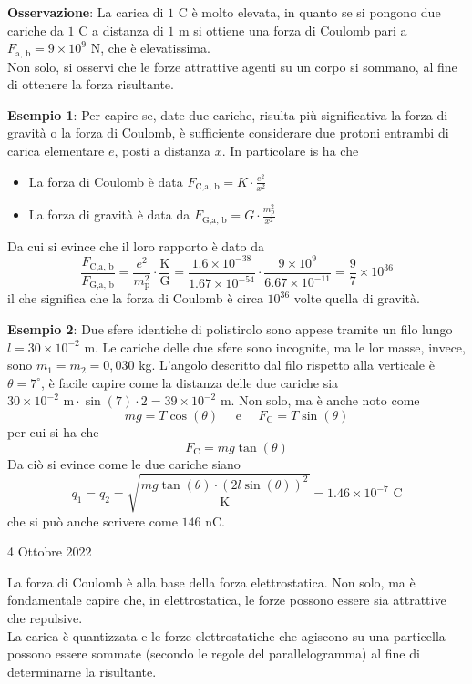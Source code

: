 \documentclass[a4paper]{extarticle}
\begin{document}
\vspace{1em}
\noindent
\textbf{Osservazione}: La carica di $1$ C è molto elevata, in quanto se si pongono due cariche da $1$ C a distanza di $1$ m si ottiene una forza di Coulomb pari a $F_{\text{a, b}} = 9 \times 10^9$ N, che è elevatissima.\\
Non solo, si osservi che le forze attrattive agenti su un corpo si sommano, al fine di ottenere la forza risultante.

\vspace{1em}
\noindent
\textbf{Esempio 1}: Per capire se, date due cariche, risulta più significativa la forza di gravità o la forza di Coulomb, è sufficiente considerare due protoni entrambi di carica elementare $e$, posti a distanza $x$.
In particolare is ha che
\begin{itemize}
  \item La forza di Coulomb è data $F_{\text{C}, \text{a, b}} = K \cdot \frac{e^2}{x^2}$
  \item La forza di gravità è data da $F_{\text{G}, \text{a, b}} = G \cdot \frac{m_\text{p}^2}{x^2}$
\end{itemize}
Da cui si evince che il loro rapporto è dato da
\[\frac{F_{\text{C}, \text{a, b}}}{F_{\text{G}, \text{a, b}}} = \frac{e^2}{m_\text{p}^2} \cdot \frac{\text{K}}{\text{G}} = \frac{1.6 \times 10^{-38}}{1.67 \times 10^{-54}} \cdot \frac{9 \times 10^9}{6.67 \times 10^{-11}} = \frac{9}{7} \times 10^{36}\]
il che significa che la forza di Coulomb è circa $10^{36}$ volte quella di gravità.

\vspace{1em}
\noindent
\textbf{Esempio 2}: Due sfere identiche di polistirolo sono appese tramite un filo lungo $l = 30 \times 10^{-2}$ m. Le cariche delle due sfere sono incognite, ma le lor masse, invece, sono $m_1 = m_2 = 0,030 $ kg.
L'angolo descritto dal filo rispetto alla verticale è $\theta = 7^{\circ}$, è facile capire come la distanza delle due cariche sia $30 \times 10^{-2} \text{ m} \cdot \sin(7) \cdot 2 = 39 \times 10^{-2} \text{ m}$.
Non solo, ma è anche noto come
\[m g = T \cos(\theta) \hspace{1em} \text{ e } \hspace{1em} F_\text{C} = T \sin(\theta)\]
per cui si ha che
\[F_\text{C} = mg \tan(\theta)\]
Da ciò si evince come le due cariche siano
\[q_1 = q_2 = \sqrt{\frac{mg \tan(\theta) \cdot (2 l \sin(\theta))^2}{\text{K}}} = 1.46 \times 10^{-7} \text{ C}\]
che si può anche scrivere come $146$ nC.

\newpage
\noindent
\begin{center}
  4 Ottobre 2022
\end{center}
La forza di Coulomb è alla base della forza elettrostatica. Non solo, ma è fondamentale capire che, in elettrostatica, le forze possono essere sia attrattive che repulsive.\\
La carica è quantizzata e le forze elettrostatiche che agiscono su una particella possono essere sommate (secondo le regole del parallelogramma) al fine di determinarne la risultante.
\end{document}
